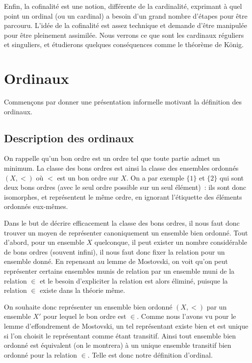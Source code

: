 Enfin, la cofinalité est une notion, différente de la cardinalité, exprimant à
quel point un ordinal (ou un cardinal) a besoin d'un grand nombre d'étapes pour
être parcouru. L'idée de la cofinalité est assez technique et demande d'être
manipulée pour être pleinement assimilée. Nous verrons ce que sont les cardinaux
réguliers et singuliers, et étudierons quelques conséquences comme le théorème
de König.

\section{Ordinaux}

Commençons par donner une présentation informelle motivant la définition des
ordinaux.

\subsection{Description des ordinaux}

On rappelle qu'un bon ordre est un ordre tel que toute partie admet un minimum.
La classe des bons ordres est ainsi la classe des ensembles ordonnés $(X,<)$
où $<$ est un bon ordre sur $X$. On a par exemple $\{1\}$ et $\{2\}$ qui sont
deux bons ordres (avec le seul ordre possible sur un seul élément)~: ils sont
donc isomorphes, et représentent le même ordre, en ignorant l'étiquette des
éléments ordonnés eux-mêmes.

Dans le but de décrire efficacement la classe des bons ordres, il nous faut donc
trouver un moyen de représenter canoniquement un ensemble bien ordonné. Tout
d'abord, pour un ensemble $X$ quelconque, il peut exister un nombre considérable
de bons ordres (souvent infini), il nous faut donc fixer la relation pour un
ensemble donné. En repensant au lemme de Mostovski, on voit qu'on peut
représenter certains ensembles munis de relation par un ensemble muni de la
relation $\in$ et le besoin d'expliciter la relation est alors éliminé, puisque
la relation $\in$ existe dans la théorie même.

On souhaite donc représenter un ensemble bien ordonné $(X,<)$ par un ensemble
$X'$ pour lequel le bon ordre est $\in$. Comme nous l'avons vu pour le lemme
d'effondrement de Mostovski, un tel représentant existe bien et est unique si
l'on choisit le représentant comme étant transitif. Ainsi tout ensemble bien
ordonné est équivalent (on le montrera) à un unique ensemble transitif bien
ordonné pour la relation $\in$. Telle est donc notre définition d'ordinal.

